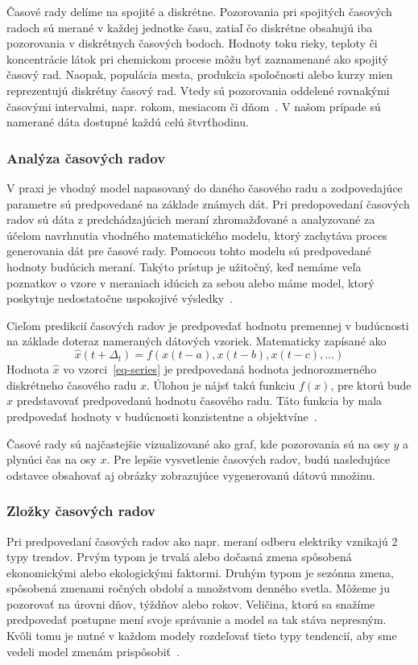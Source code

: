 \documentclass[a4paper,slovak,12pt,appendix]{article}
\begin{document}
Časové rady delíme na spojité a diskrétne. Pozorovania pri spojitých časových
radoch sú merané v každej jednotke času, zatiaľ čo diskrétne obsahujú iba
pozorovania v diskrétnych časových bodoch. Hodnoty toku rieky, teploty
či koncentrácie látok pri chemickom procese môžu byť zaznamenané ako spojitý
časový rad. Naopak, populácia mesta, produkcia spoločnosti alebo kurzy mien
reprezentujú diskrétny časový rad. Vtedy sú pozorovania oddelené rovnakými
časovými intervalmi, napr. rokom, mesiacom či dňom~\cite{Agrawal2013}. V našom
prípade sú namerané dáta dostupné každú celú štvrťhodinu.

\subsubsection{Analýza časových radov}
V praxi je vhodný model napasovaný do daného časového radu a zodpovedajúce
parametre sú predpovedané na základe známych dát. Pri predopovedaní časových
radov sú dáta z predchádzajúcich meraní zhromažďované a analyzované za účelom
navrhnutia vhodného matematického modelu, ktorý zachytáva proces generovania
dát pre časové rady. Pomocou tohto modelu sú predpovedané hodnoty budúcich
meraní. Takýto prístup je užitočný, keď nemáme veľa poznatkov o vzore
v meraniach idúcich za sebou alebo máme model, ktorý poskytuje nedostatočne
uspokojivé výsledky~\cite{Agrawal2013}.

Cieľom predikcií časových radov je predpovedať hodnotu premennej v budúcnosti
na základe doteraz nameraných dátových vzoriek. Matematicky zapísané ako
\begin{equation}
  \hat{x}(t+\Delta_t) = f(x(t-a), x(t-b), x(t-c), ...)
  \label{eq-series}
\end{equation}
Hodnota $\hat{x}$ vo vzorci~\ref{eq-series} je predpovedaná hodnota
jednorozmerného diskrétneho časového radu $x$. Úlohou je nájsť takú funkciu
$f(x)$, pre ktorú bude $\hat{x}$ predstavovať predpovedanú hodnotu časového
radu. Táto funkcia by mala predpovedať hodnoty v budúcnosti konzistentne
a objektvíne~\cite{Sapankevych2009}.

Časové rady sú najčastejšie vizualizované ako graf, kde pozorovania sú na
osy $y$ a plynúci čas na osy $x$. Pre lepšie vysvetlenie časových radov, budú
nasledujúce odstavce obsahovať aj obrázky zobrazujúce vygenerovanú dátovú
množinu.

\subsubsection{Zložky časových radov}
Pri predpovedaní časových radov ako napr. meraní odberu elektriky vznikajú
2 typy trendov. Prvým typom je trvalá alebo dočasná zmena spôsobená
ekonomickými alebo ekologickými faktormi. Druhým typom je sezónna zmena,
spôsobená zmenami ročných období a množstvom denného svetla. Môžeme ju pozorovať
na úrovni dňov, týždňov alebo rokov. Veličina, ktorú sa snažíme predpovedať
postupne mení svoje správanie a model sa tak stáva nepresným. Kvôli tomu je
nutné v každom modely rozdeľovať tieto typy tendencií, aby sme vedeli model
zmenám prispôsobiť~\cite{Grmanova2016}.
\end{document}
